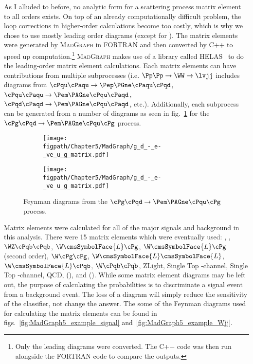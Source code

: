 As I alluded to before, no analytic form for a scattering process matrix element to all orders exists.
On top of an already computationally difficult problem, the loop corrections in higher-order calculations become too costly, which is why we chose to use mostly leading order diagrams (except for \Wjets).
The matrix elements were generated by \textsc{Mad}\textsc{Graph} in FORTRAN and then converted by C++ to speed up computation.\footnote{Only the leading diagrams were converted. The C++ code was then run alongside the FORTRAN code to compare the outputs.}
\textsc{Mad}\textsc{Graph} makes use of a library called HELAS~\cite{Murayama:1992gi} to do the leading-order matrix element calculations.
Each matrix elements can have contributions from multiple subprocesses (i.e. $\Pp\Pp\rightarrow\WW\rightarrow\lvjj$ includes diagrams from $\cPqu\cPaqu\rightarrow\Pep\PGne\cPaqu\cPqd$, $\cPqu\cPaqu\rightarrow\Pem\PAGne\cPqu\cPaqd$, $\cPqd\cPaqd\rightarrow\Pem\PAGne\cPqu\cPaqd$, etc.).
Additionally, each subprocess can be generated from a number of diagrams as seen in fig.~\ref{fig:MadGraph5_example_subdiagrams} for the $\cPg\cPqd\rightarrow\Pem\PAGne\cPqu\cPg$ process.

\begin{figure}[!hbt]
    \centering
    \begin{subfigure}[t]{0.9\textwidth}
        \texttt{[image: \\figpath/Chapter5/MadGraph/g\_d\_-\_e-\_ve\_u\_g\_matrix.pdf]}
    \end{subfigure}

    \begin{subfigure}[t]{0.9\textwidth}
        \texttt{[image: \\figpath/Chapter5/MadGraph/g\_d\_-\_e-\_ve\_u\_g\_matrix.pdf]}
    \end{subfigure}
    \caption{Feynman diagrams from the $\cPg\cPqd\rightarrow\Pem\PAGne\cPqu\cPg$ process.}
    \label{fig:MadGraph5_example_subdiagrams}
\end{figure}

Matrix elements were calculated for all of the major signals and background in this analysis.
There were 15 matrix elements which were eventually used: \WW, \WZ, $\WZ\cPqb\cPqb$, $\W\cmsSymbolFace{L}\cPg$, $\W\cmsSymbolFace{L}\cPg$ (second order), $\W\cPg\cPg$, $\W\cmsSymbolFace{L}\cmsSymbolFace{L}$, $\W\cmsSymbolFace{L}\cPqb$, $\W\cPqb\cPqb$, ZLight, Single Top \cPqt-channel, Single Top \cPqs-channel, QCD, \ggH (\joinsym{\MH}{=}{125\gev}), and \WH (\joinsym{\MH}{=}{125\gev}).
While some matrix element diagrams may be left out, the purpose of calculating the probabilities is to discriminate a signal event from a background event.
The loss of a diagram will simply reduce the sensitivity of the classifier, not change the answer.
The some of the Feynman diagrams used for calculating the matrix elements can be found in figs.~\ref{fig:MadGraph5_example_signal} and~\ref{fig:MadGraph5_example_Wjj}.

